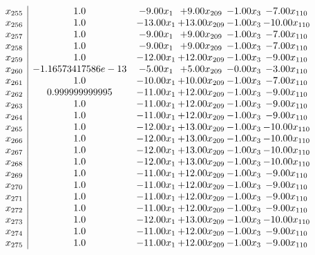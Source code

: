 \documentclass[8pt]{article}
\begin{document}
\[\begin{array}{c| c c@{\hskip 2pt} c@{\hskip 2pt} c@{\hskip 2pt} c@{\hskip 2pt} }
 x_{255}   &  1.0 & -9.00 x_{1} & +  9.00 x_{209} & -1.00 x_{3} & -7.00 x_{110}\\
 x_{256}   &  1.0 & -13.00 x_{1} & + 13.00 x_{209} & -1.00 x_{3} & -10.00 x_{110}\\
 x_{257}   &  1.0 & -9.00 x_{1} & +  9.00 x_{209} & -1.00 x_{3} & -7.00 x_{110}\\
 x_{258}   &  1.0 & -9.00 x_{1} & +  9.00 x_{209} & -1.00 x_{3} & -7.00 x_{110}\\
 x_{259}   &  1.0 & -12.00 x_{1} & + 12.00 x_{209} & -1.00 x_{3} & -9.00 x_{110}\\
 x_{260}   &  -1.16573417586e-13 & -5.00 x_{1} & +  5.00 x_{209} & -0.00 x_{3} & -3.00 x_{110}\\
 x_{261}   &  1.0 & -10.00 x_{1} & + 10.00 x_{209} & -1.00 x_{3} & -7.00 x_{110}\\
 x_{262}   &  0.999999999995 & -11.00 x_{1} & + 12.00 x_{209} & -1.00 x_{3} & -9.00 x_{110}\\
 x_{263}   &  1.0 & -11.00 x_{1} & + 12.00 x_{209} & -1.00 x_{3} & -9.00 x_{110}\\
 x_{264}   &  1.0 & -11.00 x_{1} & + 12.00 x_{209} & -1.00 x_{3} & -9.00 x_{110}\\
 x_{265}   &  1.0 & -12.00 x_{1} & + 13.00 x_{209} & -1.00 x_{3} & -10.00 x_{110}\\
 x_{266}   &  1.0 & -12.00 x_{1} & + 13.00 x_{209} & -1.00 x_{3} & -10.00 x_{110}\\
 x_{267}   &  1.0 & -12.00 x_{1} & + 13.00 x_{209} & -1.00 x_{3} & -10.00 x_{110}\\
 x_{268}   &  1.0 & -12.00 x_{1} & + 13.00 x_{209} & -1.00 x_{3} & -10.00 x_{110}\\
 x_{269}   &  1.0 & -11.00 x_{1} & + 12.00 x_{209} & -1.00 x_{3} & -9.00 x_{110}\\
 x_{270}   &  1.0 & -11.00 x_{1} & + 12.00 x_{209} & -1.00 x_{3} & -9.00 x_{110}\\
 x_{271}   &  1.0 & -11.00 x_{1} & + 12.00 x_{209} & -1.00 x_{3} & -9.00 x_{110}\\
 x_{272}   &  1.0 & -11.00 x_{1} & + 12.00 x_{209} & -1.00 x_{3} & -9.00 x_{110}\\
 x_{273}   &  1.0 & -12.00 x_{1} & + 13.00 x_{209} & -1.00 x_{3} & -10.00 x_{110}\\
 x_{274}   &  1.0 & -11.00 x_{1} & + 12.00 x_{209} & -1.00 x_{3} & -9.00 x_{110}\\
 x_{275}   &  1.0 & -11.00 x_{1} & + 12.00 x_{209} & -1.00 x_{3} & -9.00 x_{110}\\

\end{array}\]
\end{document}

